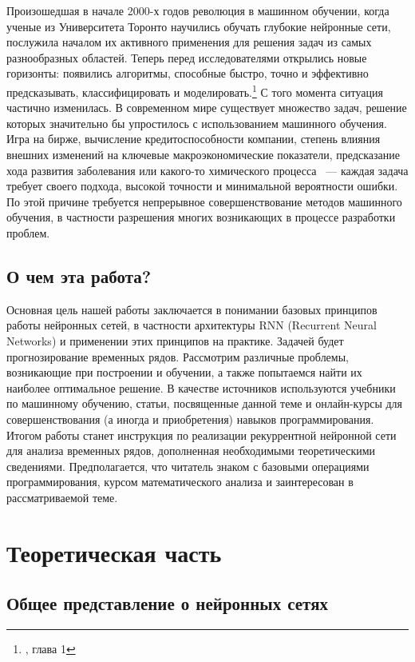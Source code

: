 \documentclass[12pt, a4paper]{article}
\begin{document}
Произошедшая в начале 2000-х годов революция в машинном обучении, когда ученые из Университета Торонто научились обучать глубокие нейронные сети, послужила началом их активного применения для решения задач из самых разнообразных областей. Теперь перед исследователями открылись новые горизонты: появились алгоритмы, способные быстро, точно и эффективно предсказывать, классифицировать и моделировать.\footnote{\cite{DeepLearning}, глава 1}
С того момента ситуация частично изменилась. В современном мире существует множество задач, решение которых значительно бы упростилось с использованием машинного обучения. Игра на бирже, вычисление кредитоспособности компании, степень влияния внешних изменений на ключевые макроэкономические показатели, предсказание хода развития заболевания или какого-то химического процесса ~--- каждая задача требует своего подхода, высокой точности и минимальной вероятности ошибки. По этой причине требуется непрерывное совершенствование методов машинного обучения, в частности разрешения многих возникающих в процессе разработки проблем.
\subsection{О чем эта работа?}

Основная цель нашей работы заключается в понимании базовых принципов работы нейронных сетей, в частности архитектуры RNN (Recurrent Neural Networks) и применении этих принципов на практике. Задачей будет прогнозирование временных рядов. Рассмотрим различные проблемы, возникающие при построении и обучении, а также попытаемся найти их наиболее оптимальное решение. В качестве источников используются учебники по машинному обучению, статьи, посвященные данной теме и онлайн-курсы для совершенствования (а иногда и приобретения) навыков программирования.
Итогом работы станет инструкция по реализации рекуррентной нейронной сети для анализа временных рядов, дополненная необходимыми теоретическими сведениями.
Предполагается, что читатель знаком с базовыми операциями программирования, курсом математического анализа и заинтересован в рассматриваемой теме.

\section{Теоретическая часть}

\subsection{Общее представление о нейронных сетях}
\end{document}
